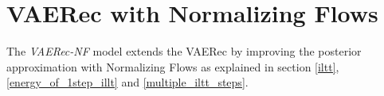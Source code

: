 \section{VAERec with Normalizing Flows}

The \emph{VAERec-NF} model
extends the VAERec by improving the posterior approximation
with Normalizing Flows \cite{1505.05770}
as explained in section \ref{iltt}, 
\ref{energy_of_1step_illt}
and \ref{multiple_iltt_steps}.

